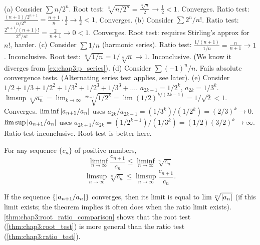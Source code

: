 \begin{example} %
  \label{ex:chap3:root_ratio_examples}
  (a) Consider $\sum n/2^n$. Root test: $\sqrt[n]{n/2^n} =
  \frac{\sqrt[n]{n}}{2} \to \frac{1}{2} < 1$. Converges. Ratio test:
  $\frac{(n+1)/2^{n+1}}{n/2^n} = \frac{n+1}{n} \cdot \frac{1}{2} \to
  \frac{1}{2} < 1$. Converges.
  (b) Consider $\sum 2^n/n!$. Ratio test:
  $\frac{2^{n+1}/(n+1)!}{2^n/n!} = \frac{2}{n+1} \to 0 < 1$.
  Converges. Root test: requires Stirling's approx for $n!$, harder.
  (c) Consider $\sum 1/n$ (harmonic series). Ratio test:
  $\frac{1/(n+1)}{1/n} = \frac{n}{n+1} \to 1$. Inconclusive. Root
  test: $\sqrt[n]{1/n} = 1/\sqrt[n]{n} \to 1$. Inconclusive. (We know
  it diverges from \autoref{ex:chap3:p_series}).
  (d) Consider $\sum (-1)^n / n$. Fails absolute convergence tests.
  (Alternating series test applies, see later).
  (e) Consider $1/2 + 1/3 + 1/2^2 + 1/3^2 + 1/2^3 + 1/3^3 + \dots$.
  $a_{2k-1} = 1/2^k$, $a_{2k} = 1/3^k$.
  $\limsup \sqrt[n]{a_n} = \lim_{k\to\infty} \sqrt[2k-1]{1/2^k} =
  \lim (1/2)^{k/(2k-1)} = 1/\sqrt{2} < 1$. Converges.
  $\liminf \left\lvert a_{n+1}/a_n \right\rvert$ uses $a_{2k}/a_{2k-1} = (1/3^k)/(1/2^k)
  = (2/3)^k \to 0$.
  $\limsup \left\lvert a_{n+1}/a_n \right\rvert$ uses $a_{2k+1}/a_{2k} =
  (1/2^{k+1})/(1/3^k) = (1/2) (3/2)^k \to \infty$. Ratio test
  inconclusive. Root test is better here.
\end{example}



\begin{theorem} %
  \label{thm:chap3:root_ratio_comparison}
  For any sequence $\{c_n\}$ of positive numbers,
  \[ \liminf_{n \to \infty} \frac{c_{n+1}}{c_n} \le \liminf_{n \to
  \infty} \sqrt[n]{c_n} \]
  \[ \limsup_{n \to \infty} \sqrt[n]{c_n} \le \limsup_{n \to \infty}
  \frac{c_{n+1}}{c_n}. \]
\end{theorem}

\begin{theorem} %
  \label{thm:chap3:limit_relation_tests}
  If the sequence $\{\left\lvert a_{n+1}/a_n \right\rvert\}$ converges, then its limit
  is equal to $\lim \sqrt[n]{\left\lvert a_n \right\rvert}$ (if this limit exists; the
  theorem implies it often does when the ratio limit exists).
  \autoref{thm:chap3:root_ratio_comparison} shows that the root test
  (\autoref{thm:chap3:root_test}) is more general than the ratio test
  (\autoref{thm:chap3:ratio_test}).
\end{theorem}

